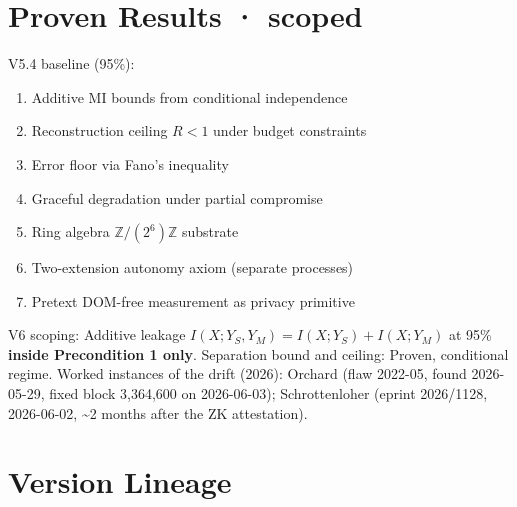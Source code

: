 \documentclass[
  11pt,
]{article}
\providecommand{\tightlist}{%
  \setlength{\itemsep}{0pt}\setlength{\parskip}{0pt}}
\begin{document}
\section{Proven Results · scoped}\label{proven-results-scoped}

V5.4 baseline (95\%):

\begin{enumerate}
\def\labelenumi{\arabic{enumi}.}
\tightlist
\item
  Additive MI bounds from conditional independence
\item
  Reconstruction ceiling \(R < 1\) under budget constraints
\item
  Error floor via Fano's inequality
\item
  Graceful degradation under partial compromise
\item
  Ring algebra \(\mathbb{Z}/(2^6)\mathbb{Z}\) substrate
\item
  Two-extension autonomy axiom (separate processes)
\item
  Pretext DOM-free measurement as privacy primitive
\end{enumerate}

V6 scoping: Additive leakage \(I(X; Y_S, Y_M) = I(X; Y_S) + I(X; Y_M)\)
at 95\% \textbf{inside Precondition 1 only}. Separation bound and
ceiling: Proven, conditional regime. Worked instances of the drift
(2026): Orchard (flaw 2022-05, found 2026-05-29, fixed block 3,364,600
on 2026-06-03); Schrottenloher (eprint 2026/1128, 2026-06-02,
\textasciitilde2 months after the ZK attestation).

\section{Version Lineage}\label{version-lineage}
\end{document}

